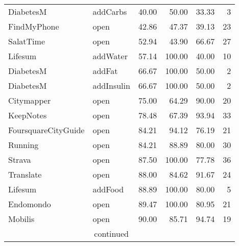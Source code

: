 \begin{table}[ht]
\begin{tabular}{llrrrr}
DiabetesM & addCarbs            &   40.00 &      50.00 &   33.33 &      3 \\
FindMyPhone & open              &   42.86 &      47.37 &   39.13 &     23 \\
SalatTime & open                &   52.94 &      43.90 &   66.67 &     27 \\
Lifesum & addWater              &   57.14 &     100.00 &   40.00 &     10 \\
DiabetesM & addFat              &   66.67 &     100.00 &   50.00 &      2 \\
DiabetesM & addInsulin          &   66.67 &     100.00 &   50.00 &      2 \\
Citymapper & open               &   75.00 &      64.29 &   90.00 &     20 \\
KeepNotes & open                &   78.48 &      67.39 &   93.94 &     33 \\
FoursquareCityGuide & open      &   84.21 &      94.12 &   76.19 &     21 \\
Running & open                  &   84.21 &      88.89 &   80.00 &     30 \\
Strava & open                   &   87.50 &     100.00 &   77.78 &     36 \\
Translate & open                &   88.00 &      84.62 &   91.67 &     24 \\
Lifesum & addFood               &   88.89 &     100.00 &   80.00 &      5 \\
Endomondo & open                &   89.47 &     100.00 &   80.95 &     21 \\
Mobilis & open                  &   90.00 &      85.71 &   94.74 &     19 \\

 \midrule
 \multicolumn{5}{c}{continued}\\
 \bottomrule
\end{tabular}
\end{table}

\newpage

